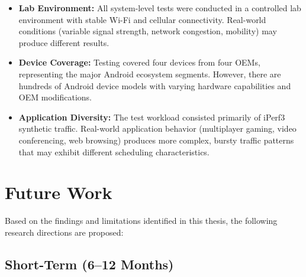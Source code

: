 \begin{itemize}
    \item \textbf{Lab Environment:} All system-level tests were conducted in a controlled lab environment with stable Wi-Fi and cellular connectivity. Real-world conditions (variable signal strength, network congestion, mobility) may produce different results.
    
    \item \textbf{Device Coverage:} Testing covered four devices from four OEMs, representing the major Android ecosystem segments. However, there are hundreds of Android device models with varying hardware capabilities and OEM modifications.
    
    \item \textbf{Application Diversity:} The test workload consisted primarily of iPerf3 synthetic traffic. Real-world application behavior (multiplayer gaming, video conferencing, web browsing) produces more complex, bursty traffic patterns that may exhibit different scheduling characteristics.
\end{itemize}

\section{Future Work}
\label{sec:future_work}

Based on the findings and limitations identified in this thesis, the following research directions are proposed:

\subsection{Short-Term (6--12 Months)}

